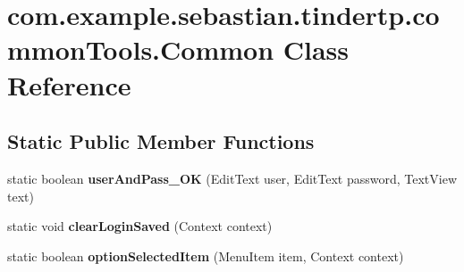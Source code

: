 \hypertarget{classcom_1_1example_1_1sebastian_1_1tindertp_1_1commonTools_1_1Common}{}\section{com.\+example.\+sebastian.\+tindertp.\+common\+Tools.\+Common Class Reference}
\label{classcom_1_1example_1_1sebastian_1_1tindertp_1_1commonTools_1_1Common}
\subsection*{Static Public Member Functions}
\begin{DoxyCompactItemize}
\item 
static boolean {\bfseries user\+And\+Pass\+\_\+\+OK} (Edit\+Text user, Edit\+Text password, Text\+View text)\hypertarget{classcom_1_1example_1_1sebastian_1_1tindertp_1_1commonTools_1_1Common_a60d6942529cc3e5192abb0662da4a59e}{}\label{classcom_1_1example_1_1sebastian_1_1tindertp_1_1commonTools_1_1Common_a60d6942529cc3e5192abb0662da4a59e}

\item 
static void {\bfseries clear\+Login\+Saved} (Context context)\hypertarget{classcom_1_1example_1_1sebastian_1_1tindertp_1_1commonTools_1_1Common_a602f78b647b4c1617a2173a9d94d97a1}{}\label{classcom_1_1example_1_1sebastian_1_1tindertp_1_1commonTools_1_1Common_a602f78b647b4c1617a2173a9d94d97a1}

\item 
static boolean {\bfseries option\+Selected\+Item} (Menu\+Item item, Context context)\hypertarget{classcom_1_1example_1_1sebastian_1_1tindertp_1_1commonTools_1_1Common_ad5a698303b87f0930ce1f129d87e22c2}{}\label{classcom_1_1example_1_1sebastian_1_1tindertp_1_1commonTools_1_1Common_ad5a698303b87f0930ce1f129d87e22c2}

\end{DoxyCompactItemize}
